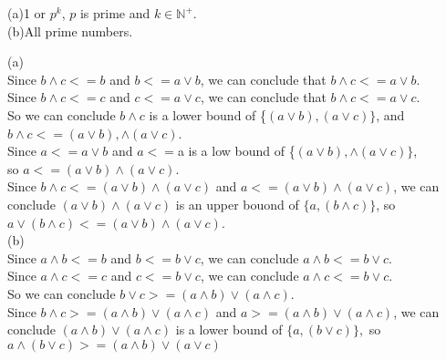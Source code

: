 \documentclass[a4paper, justified]{tufte-handout}
\begin{document}
\begin{problem}[SM Problem 14.71]
\end{problem}

\begin{solution}
  (a)1 or $p^k$, $p$ is prime and $k \in \mathbb{N}^+$.\\
  (b)All prime numbers.
\end{solution}

\begin{problem}[SM Problem 14.72]
\end{problem}

\begin{solution}
  (a)\\
  Since $b \land c <= b$ and $b <= a\lor b$, we can conclude that $b \land c <= a \lor b$.\\
  Since $b\land c <= c$ and $c <= a \lor c$, we can conclude that $b \land c <= a \lor c$.\\
  So we can conclude $b\land c$ is a lower bound of \{$(a \lor b), (a \lor c)\}$, and $b \land c <= (a \lor b), \land (a \lor c)$.\\
  Since $a <= a \lor b$ and $a <=
  $a is a low bound of \{$(a \lor b),\land (a \lor c)\}$,\\
  so $a <= (a \lor b) \land (a \lor c)$.\\
  Since $b \land c <= (a \lor b) \land (a \lor c)$ and $a <= (a \lor b) \land (a \lor c)$, we can conclude $(a \lor b) \land (a \lor c)$ is an upper bouond of $\{a, (b \land c)\}$, so $a \lor (b \land c) <= (a \lor b) \land (a \lor c)$.\\
  (b)\\
  Since $a \land b <= b$ and $ b <= b \lor c$, we can conclude $a \land b <= b \lor c$.\\
  Since $a \land c <= c$ and $c <= b \lor c$, we can conclude $a \land c <= b \lor c$.\\
  So we can conclude $b \lor c >= (a \land b) \lor (a \land c)$.\\
  Since $b \land c >= (a \land b)\lor (a\land c)$ and $a >= (a\land b)\lor (a\land c)$, we can conclude $(a\land b)\lor (a\land c)$ is a lower bound of $\{a, (b \lor c)\},$ so $a \land (b \lor c) >= (a\land b)\lor (a\lor c)$\\

\end{solution}

\begin{problem}[SM Problem 14.75]
\end{problem}
\end{document}
